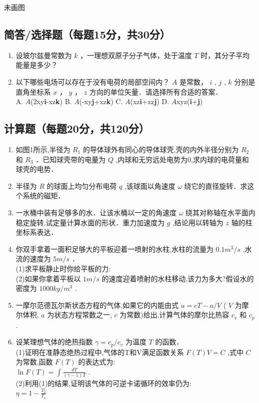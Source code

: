 
\begin{issues}
\issueTODO
未画图
\end{issues}


\subsection{简答/选择题（每题15分，共30分）}
\begin{enumerate}
\item 设玻尔兹曼常数为 $k$ ，一理想双原子分子气体，处于温度 $T$ 时，其分子平均能量是多少？
\item 以下哪些电场可以存在于没有电荷的局部空间内？ $A$ 是常数， $i$ , $j$ , $k$ 分别是直角坐标系 $x$ ， $y$ ， $z$ 方向的单位矢量．请选择所有合适的答案．\\
A. $A$(2xy\textbf{i}-xz\textbf{k}) B. $A$(-xy\textbf{j}+xz\textbf{k}) C. $A$(xz\textbf{i}+xz\textbf{j}) D. $A$xyz(\textbf{i}+\textbf{j})
\end{enumerate}
\subsection{计算题（每题20分，共120分）}
\begin{enumerate}
\item 如图1所示,半径为 $R_1$ 的导体球外有同心的导体球壳,壳的内外半径分别为 $R_2$ 和 $R_3$ ．已知球壳带的电量为 $Q$ ,内球和无穷远处电势为0,求内球的电荷量和球壳的电势．
\item 半径为 $R$ 的球面上均匀分布电荷 $q$ ,该球面以角速度 $\omega$ 绕它的直径旋转．求这个系统的磁矩．
\item 一水桶中装有足够多的水．让该水桶以一定的角速度 $\omega$ 绕其对称轴在水平面内稳定旋转,试定量计算水面的形状．重力加速度为 $g$ ,结论用以转轴为 $z$ 轴的柱坐标系表达．
\item 你双手拿着一面积足够大的平板迎着一喷射的水柱,水柱的流量为 $0.1m^{3}/s$ ,水流的速度为 $5m/s$ ．\\
(1)求平板静止时你给平板的力:\\
(2)如果你拿着平板以 $1m/s$ 的速度迎着喷射的水柱移动,该力为多大?假设水的密度为 $1000kg/m^{3}$ .
\item 一摩尔范德瓦尔斯状态方程的气体,如果它的内能由式 $u=cT-a/V$ ( $V$ 为摩尔体积, $a$ 为状态方程常数之一, $c$ 为常数)给出,计算气体的摩尔比热容 $c_v$ 和 $c_p$ .
\item 设某理想气体的绝热指数 $\gamma =c_p/c_v$ 为温度 $T$ 的函数．\\
(1)证明在准静态绝热过程中,气体的T和V满足函数关系 $F(T)V=C$ ,式中 $C$ 为常数,函数 $F(T)$ 的表达式为:\\
 $\ln F(T)=\int \frac{dT}{(\gamma-1)T}$ .\\
(2)利用(1)的结果,证明该气体的可逆卡诺循环的效率仍为:\\
$\eta =1-\frac{T_2}{T_1}$
\end{enumerate}